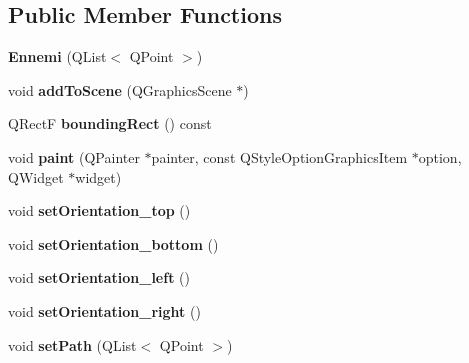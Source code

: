 \subsection*{Public Member Functions}
\begin{DoxyCompactItemize}
\item 
\hypertarget{class_ennemi_a5c39e6650828fe3f2d28833694b67298}{}{\bfseries Ennemi} (Q\+List$<$ Q\+Point $>$)\label{class_ennemi_a5c39e6650828fe3f2d28833694b67298}

\item 
\hypertarget{class_ennemi_ae62d1dcf274319710e7ac4495c95a221}{}void {\bfseries add\+To\+Scene} (Q\+Graphics\+Scene $\ast$)\label{class_ennemi_ae62d1dcf274319710e7ac4495c95a221}

\item 
\hypertarget{class_ennemi_aa00ff90bbb5d71456a23673e77c41bb4}{}Q\+Rect\+F {\bfseries bounding\+Rect} () const \label{class_ennemi_aa00ff90bbb5d71456a23673e77c41bb4}

\item 
\hypertarget{class_ennemi_afbdea6c2e62c2065694a32db0f049325}{}void {\bfseries paint} (Q\+Painter $\ast$painter, const Q\+Style\+Option\+Graphics\+Item $\ast$option, Q\+Widget $\ast$widget)\label{class_ennemi_afbdea6c2e62c2065694a32db0f049325}

\item 
\hypertarget{class_ennemi_a7c509f048996eecb4ee768a044825d15}{}void {\bfseries set\+Orientation\+\_\+top} ()\label{class_ennemi_a7c509f048996eecb4ee768a044825d15}

\item 
\hypertarget{class_ennemi_ab3bbc6381307320c22b1686c5bc59d93}{}void {\bfseries set\+Orientation\+\_\+bottom} ()\label{class_ennemi_ab3bbc6381307320c22b1686c5bc59d93}

\item 
\hypertarget{class_ennemi_ac455b7c41a46dc42a27841b9c566e329}{}void {\bfseries set\+Orientation\+\_\+left} ()\label{class_ennemi_ac455b7c41a46dc42a27841b9c566e329}

\item 
\hypertarget{class_ennemi_a4e99225c7a632efceebba66996d7d9ee}{}void {\bfseries set\+Orientation\+\_\+right} ()\label{class_ennemi_a4e99225c7a632efceebba66996d7d9ee}

\item 
\hypertarget{class_ennemi_a482e9c5ccc0cf1c3aa4e83f32f3eedb1}{}void {\bfseries set\+Path} (Q\+List$<$ Q\+Point $>$)\label{class_ennemi_a482e9c5ccc0cf1c3aa4e83f32f3eedb1}

\end{DoxyCompactItemize}
